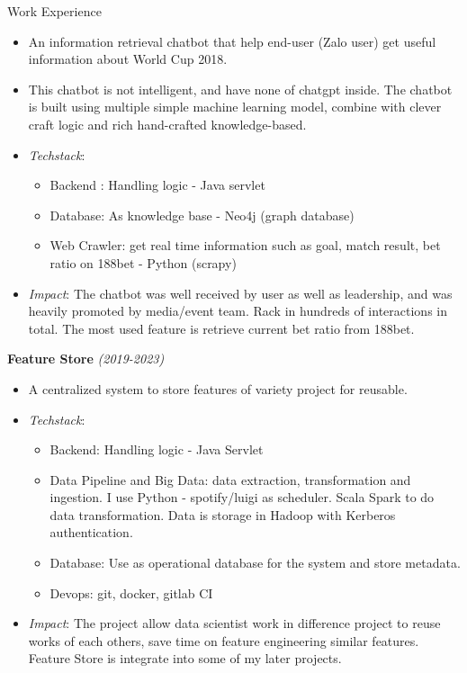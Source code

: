 \documentclass{resume} %
\begin{document}
\begin{rSection}{Work Experience}
\begin{itemize}
    \item An information retrieval chatbot that help end-user (Zalo user) get useful information about World Cup 2018.
    \item This chatbot is not intelligent, and have none of chatgpt inside. The chatbot is built using multiple simple machine learning model, combine with clever craft logic and rich hand-crafted knowledge-based.
    \item \textit{Techstack}: 
    \begin{itemize}
            \item Backend : Handling logic - Java servlet
            \item Database: As knowledge base - Neo4j (graph database)
            \item Web Crawler: get real time information such as goal, match result, bet ratio on 188bet - Python (scrapy)
    \end{itemize}
    \item \textit{Impact}: The chatbot was well received by user as well as leadership, and was heavily promoted by media/event team. Rack in hundreds of interactions in total. The most used feature is retrieve current bet ratio from 188bet.
\end{itemize}


\textbf{Feature Store} \textit{(2019-2023)}
\begin{itemize}
    \item A centralized system to store features of variety project for reusable.
    \item \textit{Techstack}:
    \begin{itemize}
        \item Backend: Handling logic - Java Servlet
        \item Data Pipeline and Big Data: data extraction, transformation and ingestion. I use Python - spotify/luigi as scheduler. Scala Spark to do data transformation. Data is storage in Hadoop with Kerberos authentication.
        \item Database: Use as operational database for the system and store metadata.
        \item Devops: git, docker, gitlab CI
    \end{itemize} 
    \item \textit{Impact}: The project allow data scientist work in difference project to reuse works of each others, save time on feature engineering similar features. Feature Store is integrate into some of my later projects.
\end{itemize}



\end{rSection}
\end{document}
